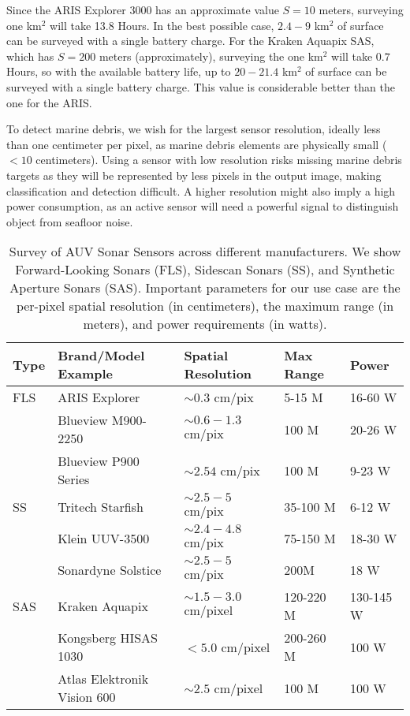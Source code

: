 Since the ARIS Explorer 3000 has an approximate value $S = 10$ meters, surveying one km$^2$ will take 13.8 Hours. In the best possible case, $2.4-9$ km$^2$ of surface can be surveyed with a single battery charge. For the Kraken Aquapix SAS, which has $S = 200$ meters (approximately), surveying the one km$^2$ will take $0.7$ Hours, so with the available battery life, up to $20-21.4$ km$^2$ of surface can be surveyed with a single battery charge. This value is considerable better than the one for the ARIS.

To detect marine debris, we wish for the largest sensor resolution, ideally less than one centimeter per pixel, as marine debris elements are physically small ($< 10$ centimeters). Using a sensor with low resolution risks missing marine debris targets as they will be represented by less pixels in the output image, making classification and detection difficult. A higher resolution might also imply a high power consumption, as an active sensor will need a powerful signal to distinguish object from seafloor noise.

\begin{table*}[t]
    \centering
    \forcerectofloat
    \begin{tabular}{lllll}
        \hline 
        Type 		& Brand/Model Example	& Spatial Resolution 	& Max Range & Power \\ 
        \hline 
        FLS 	& ARIS Explorer		 	& $\sim 0.3$ cm/pix 		& 5-15 M 	& 16-60 W \\ 
                & Blueview M900-2250	& $\sim 0.6-1.3$ cm/pix		& 100 M 	& 20-26 W\\	
                & Blueview P900 Series	& $\sim 2.54$ cm/pix		& 100 M 	& 9-23 W\\
        \hline
        SS		& Tritech Starfish 		& $\sim 2.5-5$ cm/pix 		& 35-100 M 	& 6-12 W \\ 
                & Klein UUV-3500		& $\sim 2.4-4.8$ cm/pix		& 75-150 M 	& 18-30 W\\
                & Sonardyne Solstice	& $\sim 2.5-5$ cm/pix		& 200M 		& 18 W\\
        \hline
        SAS		& Kraken Aquapix		& $\sim 1.5-3.0$ cm/pixel	& 120-220 M & 130-145 W\\
                & Kongsberg HISAS 1030	& $< 5.0$ cm/pixel			& 200-260 M	& 100 W\\
                & Atlas Elektronik Vision 600 & $\sim 2.5$ cm/pixel	& 100 M 	& 100 W\\
        \hline
    \end{tabular}
    \caption[Survey of AUV Sonar Sensors across different manufacturers]{Survey of AUV Sonar Sensors across different manufacturers. We show Forward-Looking Sonars (FLS), Sidescan Sonars (SS), and Synthetic Aperture Sonars (SAS). Important parameters for our use case are the per-pixel spatial resolution (in centimeters), the maximum range (in meters), and power requirements (in watts).}
    \label{intro:sonar-survey}
    \vspace*{0.5cm}
\end{table*}


